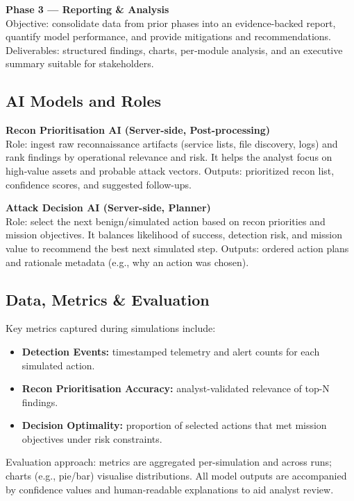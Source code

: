 \documentclass[a4paper,12pt]{article}
\begin{document}
\textbf{Phase 3 — Reporting \& Analysis} \\
Objective: consolidate data from prior phases into an evidence-backed report, quantify model performance, and provide mitigations and recommendations.  
Deliverables: structured findings, charts, per‑module analysis, and an executive summary suitable for stakeholders.

\subsection*{AI Models and Roles}
\textbf{Recon Prioritisation AI (Server-side, Post-processing)} \\
Role: ingest raw reconnaissance artifacts (service lists, file discovery, logs) and rank findings by operational relevance and risk. It helps the analyst focus on high‑value assets and probable attack vectors.  
Outputs: prioritized recon list, confidence scores, and suggested follow-ups.

\textbf{Attack Decision AI (Server-side, Planner)} \\
Role: select the next benign/simulated action based on recon priorities and mission objectives. It balances likelihood of success, detection risk, and mission value to recommend the best next simulated step.  
Outputs: ordered action plans and rationale metadata (e.g., why an action was chosen).

\subsection*{Data, Metrics \& Evaluation}
Key metrics captured during simulations include:
\begin{itemize}
    \item \textbf{Detection Events:} timestamped telemetry and alert counts for each simulated action.
    \item \textbf{Recon Prioritisation Accuracy:} analyst-validated relevance of top-N findings.
    \item \textbf{Decision Optimality:} proportion of selected actions that met mission objectives under risk constraints.
\end{itemize}

Evaluation approach: metrics are aggregated per-simulation and across runs; charts (e.g., pie/bar) visualise distributions. All model outputs are accompanied by confidence values and human-readable explanations to aid analyst review.
\end{document}
